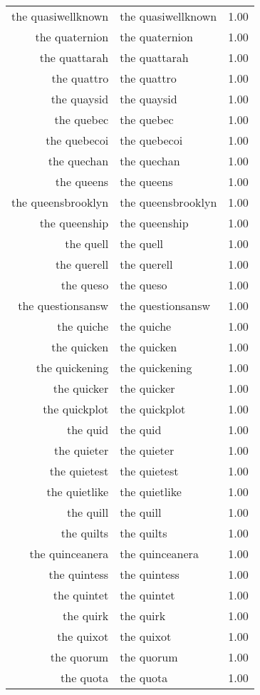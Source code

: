 \begin{table}[ht]
\begin{tabular}{rlr}
  the quasiwellknown & the quasiwellknown & 1.00 \\ 
  the quaternion & the quaternion & 1.00 \\ 
  the quattarah & the quattarah & 1.00 \\ 
  the quattro & the quattro & 1.00 \\ 
  the quaysid & the quaysid & 1.00 \\ 
  the quebec & the quebec & 1.00 \\ 
  the quebecoi & the quebecoi & 1.00 \\ 
  the quechan & the quechan & 1.00 \\ 
  the queens & the queens & 1.00 \\ 
  the queensbrooklyn & the queensbrooklyn & 1.00 \\ 
  the queenship & the queenship & 1.00 \\ 
  the quell & the quell & 1.00 \\ 
  the querell & the querell & 1.00 \\ 
  the queso & the queso & 1.00 \\ 
  the questionsansw & the questionsansw & 1.00 \\ 
  the quiche & the quiche & 1.00 \\ 
  the quicken & the quicken & 1.00 \\ 
  the quickening & the quickening & 1.00 \\ 
  the quicker & the quicker & 1.00 \\ 
  the quickplot & the quickplot & 1.00 \\ 
  the quid & the quid & 1.00 \\ 
  the quieter & the quieter & 1.00 \\ 
  the quietest & the quietest & 1.00 \\ 
  the quietlike & the quietlike & 1.00 \\ 
  the quill & the quill & 1.00 \\ 
  the quilts & the quilts & 1.00 \\ 
  the quinceanera & the quinceanera & 1.00 \\ 
  the quintess & the quintess & 1.00 \\ 
  the quintet & the quintet & 1.00 \\ 
  the quirk & the quirk & 1.00 \\ 
  the quixot & the quixot & 1.00 \\ 
  the quorum & the quorum & 1.00 \\ 
  the quota & the quota & 1.00 \\ 

\end{tabular}
\end{table}
